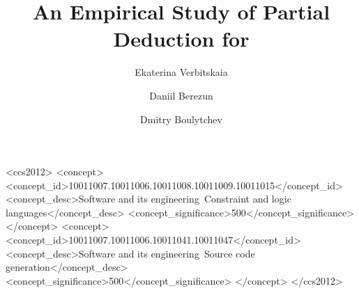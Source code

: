 \documentclass[acmlarge]{acmart}
\begin{document}
\title{An Empirical Study of Partial Deduction for \mk{}}


\author{Ekaterina Verbitskaia}

\author{Daniil Berezun}

\author{Dmitry Boulytchev}




\renewcommand{\shortauthors}{Verbitskaia, Berezun and Boulytchev.}



\begin{CCSXML}
  <ccs2012>
  <concept>
  <concept_id>10011007.10011006.10011008.10011009.10011015</concept_id>
  <concept_desc>Software and its engineering~Constraint and logic languages</concept_desc>
  <concept_significance>500</concept_significance>
  </concept>
  <concept>
  <concept_id>10011007.10011006.10011041.10011047</concept_id>
  <concept_desc>Software and its engineering~Source code generation</concept_desc>
  <concept_significance>500</concept_significance>
  </concept>
  </ccs2012>
\end{CCSXML}


\maketitle









\end{document}
